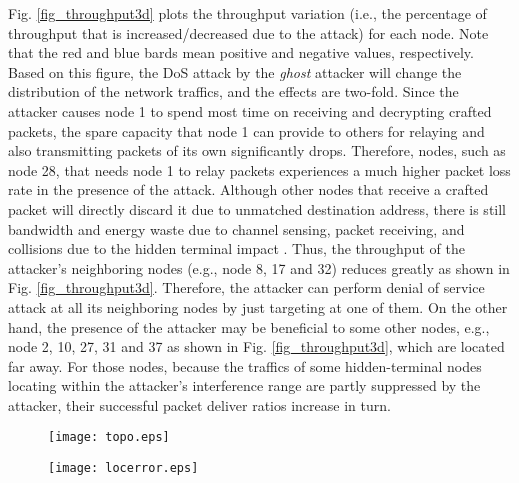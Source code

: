 \documentclass[10pt,journal,cspaper,compsoc]{IEEEtran}
\begin{document}
Fig. \ref{fig_throughput3d} plots the throughput variation (i.e., the percentage of throughput that is increased/decreased due to the attack) for each node. Note that the red and blue bards mean positive and negative values, respectively. Based on this figure, the DoS attack by the {\em ghost} attacker will change the distribution of the network traffics, and the effects are two-fold. Since the attacker causes node 1 to spend most time on receiving and decrypting crafted packets, the spare capacity that node 1 can provide to others for relaying and also transmitting packets of its own significantly drops. Therefore, nodes, such as node 28, that needs node 1 to relay packets experiences a much higher packet loss rate in the presence of the attack. Although other nodes that receive a crafted packet will directly discard it due to unmatched destination address, there is still bandwidth and energy waste due to channel sensing, packet receiving, and collisions due to the hidden terminal impact \cite{tsertou2008revisiting}. Thus, the throughput of the attacker's neighboring nodes (e.g., node 8, 17 and 32) reduces greatly as shown in Fig. \ref{fig_throughput3d}. Therefore, the attacker can perform denial of service attack at all its neighboring nodes by just targeting at one of them. On the other hand, the presence of the attacker may be beneficial to some other nodes, e.g., node 2, 10, 27, 31 and 37 as shown in Fig. \ref{fig_throughput3d}, which are located far away. For those nodes, because the traffics of some hidden-terminal nodes locating within the attacker's interference range are partly suppressed by the attacker, their successful packet deliver ratios increase in turn.


\begin{figure}[!ht]
\hspace{-4.5mm}
\centering
\begin{minipage}{.22\textwidth}
  \centering
        \texttt{[image: topo.eps]}
  \vspace{-4mm}
  \label{fig_top}
\end{minipage}\hspace{5mm}
\begin{minipage}{.22\textwidth}
  \centering
    	\texttt{[image: locerror.eps]}
  \vspace{-4mm}
  \label{fig_locerror}
\end{minipage}
\end{figure}
\end{document}
